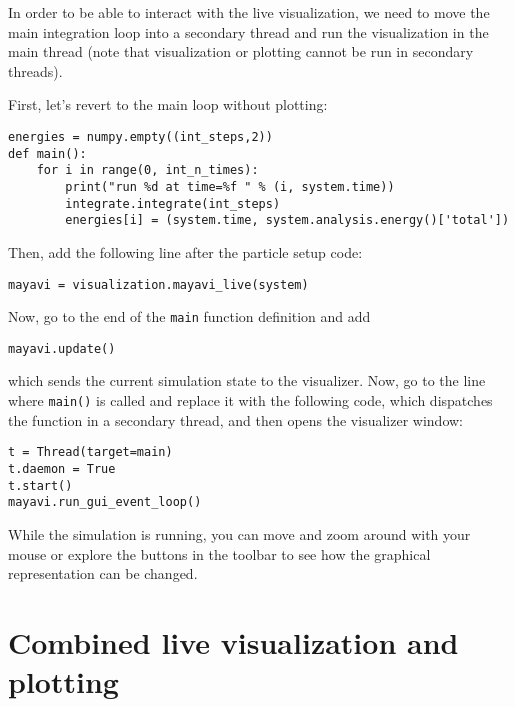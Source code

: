 \documentclass[
paper=a4,                       %
fontsize=11pt,                  %
twoside,                        %
footsepline,                    %
headsepline,                    %
headinclude=false,              %
footinclude=false,              %
pagesize,                       %
]{scrartcl}
\begin{document}
In order to be able to interact with the live visualization, we need to move the main integration loop into a secondary thread and run the visualization in the main thread (note that visualization or plotting cannot be run in secondary threads).

First, let's revert to the main loop without plotting:
\begin{lstlisting}
energies = numpy.empty((int_steps,2))
def main():
    for i in range(0, int_n_times):
        print("run %d at time=%f " % (i, system.time))
        integrate.integrate(int_steps)
        energies[i] = (system.time, system.analysis.energy()['total'])
\end{lstlisting}

Then, add the following line after the particle setup code:
\begin{lstlisting}
mayavi = visualization.mayavi_live(system)
\end{lstlisting}
Now, go to the end of the \lstinline{main} function definition and add
\begin{lstlisting}
mayavi.update()
\end{lstlisting}
which sends the current simulation state to the visualizer.
Now, go to the line where \lstinline{main()} is called and replace it with the following code, which dispatches the function in a secondary thread, and then opens the visualizer window:
\begin{lstlisting}
t = Thread(target=main)
t.daemon = True
t.start()
mayavi.run_gui_event_loop()
\end{lstlisting}
While the simulation is running, you can move and zoom around with your mouse or explore the buttons in the toolbar to see how the graphical representation can be changed.

\section{Combined live visualization and plotting}
\end{document}
